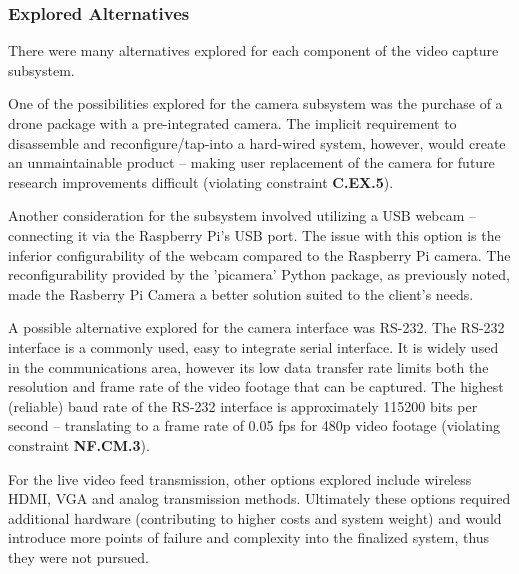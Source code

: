 \subsubsection{Explored Alternatives}
There were many alternatives explored for each component of the video capture subsystem.

One of the possibilities explored for the camera subsystem was the purchase of a drone package with a pre-integrated camera. The implicit requirement to disassemble and reconfigure/tap-into a hard-wired system, however, would create an unmaintainable product -- making user replacement of the camera for future research improvements difficult (violating constraint \textbf{C.EX.5}).

Another consideration for the subsystem involved utilizing a USB webcam -- connecting it via the Raspberry Pi's USB port. The issue with this option is the inferior configurability of the webcam compared to the Raspberry Pi camera. The reconfigurability provided by the 'picamera' Python package, as previously noted, made the Rasberry Pi Camera a better solution suited to the client's needs.

A possible alternative explored for the camera interface was RS-232. The RS-232 interface is a commonly used, easy to integrate serial interface. It is widely used in the communications area, however its low data transfer rate limits both the resolution and frame rate of the video footage that can be captured. The highest (reliable) baud rate of the RS-232 interface is approximately 115200 bits per second -- translating to a frame rate of 0.05 fps for 480p video footage (violating constraint \textbf{NF.CM.3}).

For the live video feed transmission, other options explored include wireless HDMI, VGA and analog transmission methods.  Ultimately these options required additional hardware (contributing to higher costs and system weight) and would introduce more points of failure and complexity into the finalized system, thus they were not pursued.
